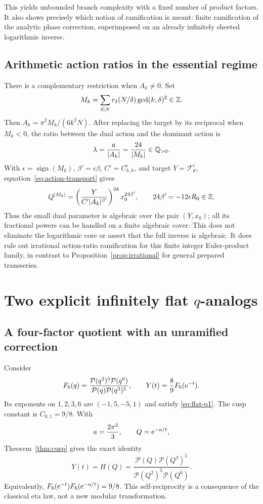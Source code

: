\documentclass[11pt,a4paper]{article}
\numberwithin{equation}{section}
\theoremstyle{definition}\newtheorem{definition}[theorem]{Definition}
\theoremstyle{remark}\newtheorem{remark}[theorem]{Remark}
\newcommand{\Poch}{\mathcal P}\newcommand{\F}{\mathcal F}
\newcommand{\vct}[1]{\boldsymbol{#1}}
\begin{document}
This yields unbounded branch complexity with a fixed number of product
factors. It also shows precisely which notion of ramification is meant:
finite ramification of the analytic phase correction, superimposed on
an already infinitely sheeted logarithmic inverse.

\subsection{Arithmetic action ratios in the essential regime}
There is a complementary restriction when $A_k\ne0$. Set
\[
 M_k=\sum_{\delta\mid N}r_\delta(N/\delta)\gcd(k,\delta)^2\in\mathbb Z.
\]
Then $A_k=\pi^2M_k/(6k^2N)$. After replacing the target by its reciprocal
when $M_k<0$, the ratio between the dual action and the dominant action is
\begin{equation}\label{eq:rational-action}
 \lambda=\frac{a}{|A_k|}=\frac{24}{|M_k|}\in\mathbb Q_{>0}.
\end{equation}
With $\epsilon=\operatorname{sign}(M_k)$,
$\beta'=\epsilon\beta$, $C'=C_{h,k}^{\epsilon}$, and target
$Y=\F_{\vct r}^{\epsilon}$, equation~\eqref{eq:action-transport} gives
\begin{equation}\label{eq:algebraic-Q}
 Q^{|M_k|}
 =\left(\frac{Y}{C'|A_k|^{\beta'}}\right)^{24}
        x_0^{24\beta'},\qquad 24\beta'=-12\epsilon R_0\in\mathbb Z.
\end{equation}
Thus the small dual parameter is algebraic over the pair $(Y,x_0)$;
all its fractional powers can be handled on a finite algebraic cover.
This does not eliminate the logarithmic core or assert that the full
inverse is algebraic. It does rule out irrational action-ratio
ramification for this finite integer Euler-product family, in contrast
to Proposition~\ref{prop:irrational} for general prepared transseries.

\section{Two explicit infinitely flat \texorpdfstring{$q$}{q}-analogs}
\label{sec:examples}

\subsection{A four-factor quotient with an unramified correction}
Consider
\begin{equation}\label{eq:example6}
 F_6(q)=\frac{\Poch(q^2)^5\Poch(q^6)}{\Poch(q)\Poch(q^3)^5},
 \qquad Y(t)=\frac89F_6(\e^{-t}).
\end{equation}
Its exponents on $1,2,3,6$ are $(-1,5,-5,1)$ and satisfy
\eqref{eq:flat-q1}. The cusp constant is $C_{0,1}=9/8$. With
\[
 a=\frac{2\pi^2}{3},\qquad Q=\mathrm e^{-a/t},
\]
Theorem~\ref{thm:cusp} gives the exact identity
\begin{equation}\label{eq:H6}
 Y(t)=H(Q)=\frac{\Poch(Q)\Poch(Q^3)^5}
                         {\Poch(Q^2)^5\Poch(Q^6)}.
\end{equation}
Equivalently,
$F_6(\mathrm e^{-t})F_6(\mathrm e^{-a/t})=9/8$.
This self-reciprocity is a consequence of the classical eta law, not a
new modular transformation.
\end{document}
